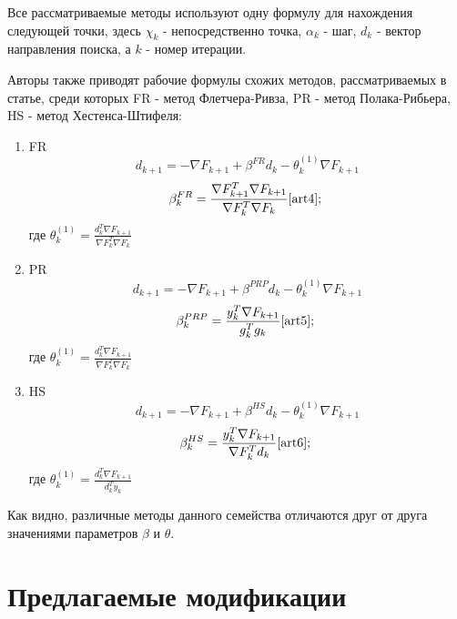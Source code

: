 \noindent Все рассматриваемые методы используют одну формулу для нахождения
следующей точки, здесь $\chi_{k}$ - непосредственно точка, $\alpha_{k}$ - шаг,
$d_{k}$ - вектор направления поиска, а $k$ - номер итерации.

\noindent Авторы также приводят рабочие формулы схожих методов, рассматриваемых
в статье, среди которых FR - метод Флетчера-Ривза, PR - метод Полака-Рибьера, HS
- метод Хестенса-Штифеля:

\begin{enumerate}
    \item FR
    \begin{equation*}
        d_{k+1}=-\nabla F_{k+1}+\beta^{F R}d_{k}-\theta_{k}^{(1)}\nabla F_{k+1}
    \end{equation*}
    \begin{equation*}
        \beta_{k}^{F R}=\frac{{\cal \nabla}F_{k+1}^{T}{\cal \nabla}F_{k+1}}{{\cal \nabla}F_{k}^{T}{\cal \nabla}F_{k}} \text{\cite{art4}}; \
    \end{equation*}
    где $ \theta_{k}^{(1)}=\frac{d_{k}^{T}\nabla F_{k+1}}{\nabla F_{k}^{T}\nabla F_{k}} $
    \item PR
    \begin{equation*}
        d_{k+1}=-\nabla F_{k+1}+\beta^{P R P}d_{k}-\theta_{k}^{(1)}\nabla F_{k+1}
    \end{equation*}
    \begin{equation*}
        \beta_{k}^{P R P}=\frac{y_{k}^{T}\nabla F_{k+1}}{g_{k}^{T}g_{k}}\nonumber \text{\cite{art5}}; \
    \end{equation*}
    где $\theta_{k}^{(1)}=\frac{d_{k}^{T}\nabla F_{k+1}}{\nabla F_{k}^{T}\nabla F_{k}}$
    \item HS
    \begin{equation*}
        d_{k+1}=-\nabla F_{k+1}+\beta^{H S}d_{k}-\theta_{k}^{(1)}\nabla F_{k+1}
    \end{equation*}
    \begin{equation*}
        \beta_{k}^{H S}=\frac{y_{k}^{T}\nabla F_{k+1}}{\nabla F_{k}^{T}d_{k}} \text{\cite{art6}}; \
    \end{equation*}
    где $ \theta_{k}^{(1)}=\frac{d_{k}^{T}\nabla F_{k+1}}{d_{k}^{T}y_{k}} $
\end{enumerate}

\noindent Как видно, различные методы данного семейства отличаются друг от друга
значениями параметров $\beta$ и $\theta$.

\section{Предлагаемые модификации}

